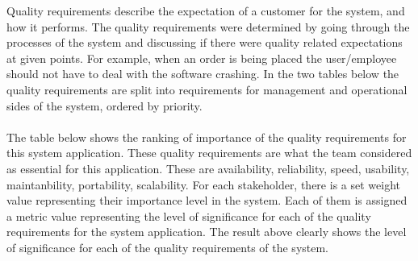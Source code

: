 Quality requirements describe the expectation of a customer for the system, and how it performs. The quality requirements were determined by going through the processes of the system and discussing if there were quality related expectations at given points. For example, when an order is being placed the user/employee should not have to deal with the software crashing. In the two tables below the quality requirements are split into requirements for management and operational sides of the system, ordered by priority. \\ \\The table below shows the ranking of importance of the quality requirements for this system application. These quality requirements are what the team considered as essential for this application. These are availability, reliability, speed, usability, maintanbility, portability, scalability.
For each stakeholder, there is a set weight value representing their importance level in the system. Each of them is assigned a metric value representing the level of significance for each of the quality requirements for the system application. The result above clearly shows the level of significance for each of the quality requirements of the system.\\ \\


